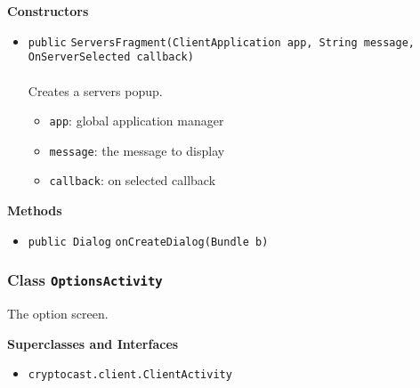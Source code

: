 \textbf{\sffamily Constructors}
\begin{itemize}
\item \lstinline|public| \lstinline|ServersFragment|\lstinline|(ClientApplication app, String message, OnServerSelected callback)|\\ \\[-0.6em]
Creates a servers popup.
\begin{itemize}
\item \lstinline|app|: global application manager
\item \lstinline|message|: the message to display
\item \lstinline|callback|: on selected callback
\end{itemize}



\end{itemize}


\textbf{\sffamily Methods}
\begin{itemize}
\item \lstinline|public Dialog| \lstinline|onCreateDialog|\lstinline|(Bundle b)| \\[-0.6em]




\end{itemize}

\subsubsection{Class \lstinline|OptionsActivity|}
The option screen. \\
\noindent\begin{minipage}[t]{5cm}
\vspace{0.3em}
\hspace*{2em}
\vspace{0.3em}
\end{minipage}



\textbf{\sffamily Superclasses and Interfaces}
\begin{itemize}
\item \lstinline|cryptocast.client.ClientActivity|
\end{itemize}



